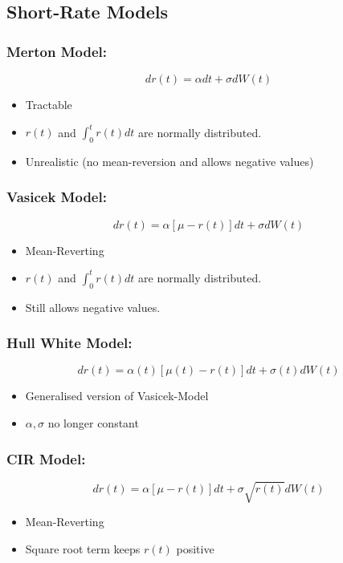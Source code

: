 \documentclass[11pt]{article}
\begin{document}
	\subsection{Short-Rate Models}
	\subsubsection{Merton Model:}
	\[	
		dr(t) = \alpha dt + \sigma dW(t)
			\]
	\begin{itemize}
		\item Tractable
		\item \( r(t) \) and \(\int_{0}^{t} r(t)dt \) are normally distributed.
		\item Unrealistic (no mean-reversion and allows negative values)
		\end{itemize}
	
	\subsubsection{Vasicek Model:}
	\[	dr(t) = \alpha \left[\mu - r(t)\right] dt + \sigma dW(t)
		\]
	\begin{itemize}
		\item Mean-Reverting
		\item \( r(t) \) and \(\int_{0}^{t} r(t)dt \) are normally distributed.
		\item Still allows negative values.
		\end{itemize}
	
	\subsubsection{Hull White Model:}
	\[	
	dr(t) = \alpha(t)\left[\mu(t) - r(t)\right]dt + \sigma(t)dW(t)
	\]
	\begin{itemize}
		\item Generalised version of Vasicek-Model
		\item \( \alpha,\sigma \) no longer constant
	\end{itemize}

	\subsubsection{CIR Model:}
	\[	dr(t) = \alpha\left[\mu - r(t)\right]dt + \sigma\sqrt{r(t)} dW(t)
		\]
		\begin{itemize}
		\item Mean-Reverting
		\item Square root term keeps \( r(t) \) positive
	\end{itemize}
\end{document}
